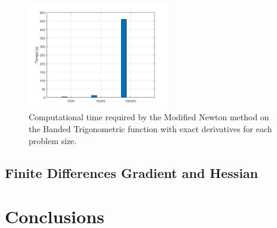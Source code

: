 \documentclass[a4paper,12pt]{article}
\begin{document}
	\begin{figure}[htbp]
		\centering
		\includegraphics[width=0.55\textwidth]{../immagini/banded_time.png}
		\caption{Computational time required by the Modified Newton method on the Banded Trigonometric function with exact derivatives for each problem size.}
		\label{fig:bt_time_exact}
	\end{figure}
	
	
	
	
	
	\subsection{Finite Differences Gradient and Hessian}
	
	\section{Conclusions}
	
	
	
\end{document}
